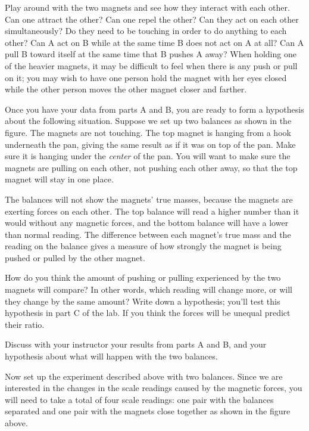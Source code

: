 
Play around with the two magnets and see how they interact
with each other. Can one attract the other?  Can one repel
the other?  Can they act on each other simultaneously? Do
they need to be touching in order to do anything to each
other?   Can A act on B while at the same time B does
not act on A at all?  Can A pull B toward itself at the
same time that B pushes A away?  When holding one of the
heavier magnets, it may be difficult to feel when there is
any push or pull on it; you may wish to have one person hold
the magnet with her eyes closed while the other person moves
the other magnet closer and farther.


Once you have your data from parts A and B, you are
ready to form a hypothesis about the following situation. 
Suppose we set up two balances as shown in the figure.  The
magnets are not touching.  The top magnet is hanging from a
hook underneath the pan, giving the same result as if it was
on top of the pan.  Make sure it is hanging under the
\emph{center} of the pan. You will want to make sure the
magnets are pulling on each other, not pushing each other
away, so that the top magnet will stay in one place.


The balances will not show the magnets' true masses, because
the magnets are exerting forces on each other.  The top
balance will read a higher number than it would without any
magnetic forces, and the bottom balance will have a lower
than normal reading.  The difference between each magnet's
true mass and the reading on the balance gives a measure of
how strongly the magnet is being pushed or pulled by the other magnet.

How do you think the amount of pushing or pulling experienced
by the two magnets will compare?  In other words, which
reading will change more, or will they change by the same
amount?  Write down a hypothesis;  you'll test this
hypothesis in part C of the lab. If you think the forces
will be unequal predict their ratio.

Discuss with your instructor your results from parts A and
B, and your hypothesis about what will happen with the two
balances.

Now set up the experiment described above with two balances.
 Since we are interested in the changes in the scale
readings caused by the magnetic forces, you will need to
take a total of four scale readings: one pair with the
balances separated and one pair with the magnets close
together as shown in the figure above.

